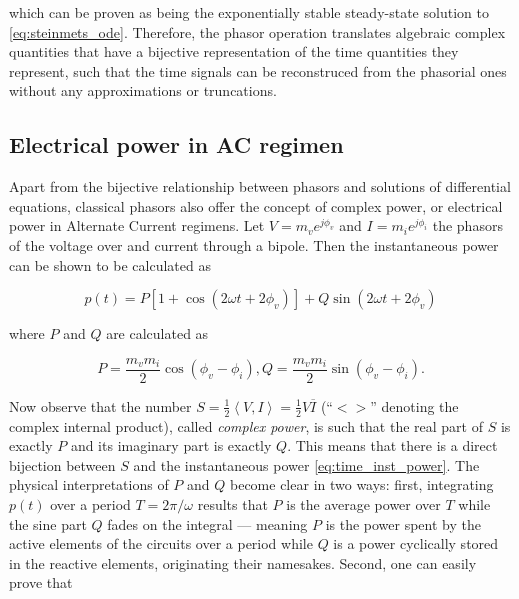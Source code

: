 	\noindent which can be proven as being the exponentially stable steady-state solution to \eqref{eq:steinmets_ode}. Therefore, the phasor operation translates algebraic complex quantities that have a bijective representation of the time quantities they represent, such that the time signals can be reconstruced from the phasorial ones without any approximations or truncations.

\subsection{Electrical power in AC regimen}\label{subsec:acpower}

	 Apart from the bijective relationship between phasors and solutions of differential equations, classical phasors also offer the concept of complex power, or electrical power in Alternate Current regimens. Let $V = m_ve^{j\phi_v}$ and $I = m_ie^{j\phi_i}$ the phasors of the voltage over and current through a bipole. Then the instantaneous power can be shown to be calculated as

\begin{equation} p(t) = P\left[1 + \cos\left(2\omega t + 2\phi_v\right)\right] + Q\sin\left(2\omega t + 2\phi_v\right) \label{eq:time_inst_power}\end{equation}

	\noindent where $P$ and $Q$ are calculated as

\begin{equation} P = \dfrac{m_vm_i}{2}\cos\left(\phi_v - \phi_i\right), Q = \dfrac{m_vm_i}{2}\sin\left(\phi_v - \phi_i\right) . \label{eq:static_pq}\end{equation}

	Now observe that the number $S = \frac{1}{2}\left<V,I\right> = \frac{1}{2}V\overline{I}$ (``$<>$'' denoting the complex internal product), called \textit{complex power}, is such that the real part of $S$ is exactly $P$ and its imaginary part is exactly $Q$. This means that there is a direct bijection between $S$ and the instantaneous power \eqref{eq:time_inst_power}. The physical interpretations of $P$ and $Q$ become clear in two ways: first, integrating $p(t)$ over a period $T = 2\pi/\omega$ results that $P$ is the average power over $T$ while the sine part $Q$ fades on the integral — meaning $P$ is the power spent by the active elements of the circuits over a period while $Q$ is a power cyclically stored in the reactive elements, originating their namesakes. Second, one can easily prove that

